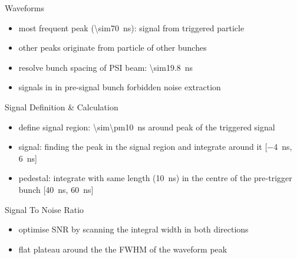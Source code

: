 \begin{frame}{Waveforms}

	\vspace*{-20pt}
	\vspace*{-20pt}
	\vspace*{-10pt}

	\begin{itemize}\itemfill
		\item most frequent peak (\SI{\sim70}{ns}): signal from triggered particle
		\item other peaks originate from particle of other bunches 
		\item resolve bunch spacing of PSI beam: \SI{\sim19.8}{ns}
		\item signals in in pre-signal bunch forbidden \ra noise extraction
	\end{itemize}
	
\end{frame}
\begin{frame}{Signal Definition \& Calculation}
 
	\vspace*{-10pt}
	
	\begin{itemize} \itemfill
		\item define signal region: \SI{\sim\pm10}{\nano\second} around peak of the triggered signal 
		\item signal: finding the peak in the signal region and integrate around it [\SI{-4}{\nano\second}, \SI{6}{\nano\second}]
		\item pedestal: integrate with same length (\SI{10}{\nano\second}) in the centre of the pre-trigger bunch [\SI{40}{\nano\second}, \SI{60}{\nano\second}]
	\end{itemize}
 
\end{frame}
\begin{frame}{Signal To Noise Ratio}
	
	\vspace*{-10pt}
	
	\begin{itemize}\itemfill
		\item optimise SNR by scanning the integral width in both directions
		\item flat plateau around the the FWHM of the waveform peak
	\end{itemize}
 
\end{frame}
